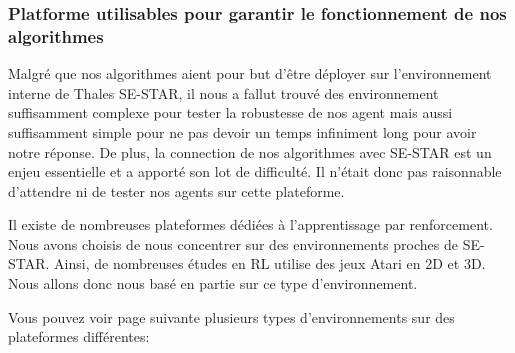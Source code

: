 \subsubsection{Platforme utilisables pour garantir le fonctionnement de nos algorithmes}

Malgré que nos algorithmes aient pour but d'être déployer sur l'environnement interne de Thales SE-STAR, il nous a fallut trouvé des environnement suffisamment complexe pour tester la robustesse de nos agent mais aussi suffisamment simple pour ne pas devoir un temps infiniment long pour avoir notre réponse. De plus, la connection de nos algorithmes avec SE-STAR est un enjeu essentielle et a apporté son lot de difficulté. Il n'était donc pas raisonnable d'attendre ni de tester nos agents sur cette plateforme.

Il existe de nombreuses plateformes dédiées à l'apprentissage par renforcement. Nous avons choisis de nous concentrer sur des environnements proches de SE-STAR. Ainsi, de nombreuses études en RL utilise des jeux Atari en 2D et 3D. Nous allons donc nous basé en partie sur ce type d'environnement.

Vous pouvez voir page suivante plusieurs types d'environnements sur des plateformes différentes:

